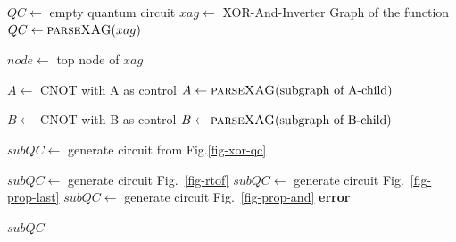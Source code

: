 \documentclass[conference]{IEEEtran}
\begin{document}
\begin{algorithm}
  \caption{Proposed Method}
  \label{alg-prop}
  \begin{algorithmic}[1]

    \State $QC \gets$ empty quantum circuit
    \State $xag \gets$ XOR-And-Inverter Graph of the function
    \State $QC \gets \textsc{parseXAG}(xag)$

    \State $node \gets$ top node of $xag$
    
    \State $A \gets$ CNOT with A as control
    \Else
    \State $A \gets \textsc{parseXAG}(\text{subgraph of A-child})$
    \EndIf

    \State $B \gets$ CNOT with B as control
    \Else
    \State $B \gets \textsc{parseXAG}(\text{subgraph of B-child})$
    \EndIf

    \State $subQC \gets$ generate circuit from Fig.\ref{fig-xor-qc}

       \State $subQC \gets$ generate circuit Fig.~\ref{fig-rtof}
       \State $subQC \gets$ generate circuit Fig.~\ref{fig-prop-last}
       \State $subQC \gets$ generate circuit Fig.~\ref{fig-prop-and}
    \Else
       \State \textbf{error}
    \EndIf
    \EndIf

    \State \Return $subQC$
    \EndFunction

  \end{algorithmic}
\end{algorithm}



%
%
\end{document}
